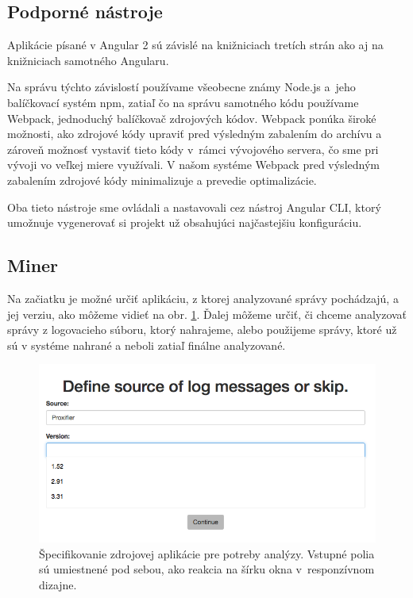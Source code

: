 \subsection{Podporné nástroje}
Aplikácie písané v Angular 2 sú závislé na knižniciach tretích strán ako aj na knižniciach samotného Angularu.
\par Na správu týchto závislostí používame všeobecne známy Node.js a~jeho balíčkovací systém npm, zatiaľ čo na správu samotného kódu používame Webpack, jednoduchý balíčkovač zdrojových kódov. Webpack ponúka široké možnosti, ako zdrojové kódy upraviť pred výsledným zabalením do archívu a zároveň možnosť vystaviť tieto kódy v~rámci vývojového servera, čo sme pri vývoji vo veľkej miere využívali. V našom systéme Webpack pred výsledným zabalením zdrojové kódy minimalizuje a prevedie optimalizácie.
\par Oba tieto nástroje sme ovládali a nastavovali cez nástroj Angular CLI, ktorý umožnuje vygenerovať si projekt už obsahujúci najčastejšiu konfiguráciu.


\subsection{Miner}
Na začiatku je možné určiť aplikáciu, z ktorej analyzované správy pochádzajú, a jej verziu, ako môžeme vidieť na obr. \ref{fig:miner-source}. Ďalej môžeme určiť, či chceme analyzovať správy z logovacieho súboru, ktorý nahrajeme, alebo použijeme správy, ktoré už sú v systéme nahrané a neboli zatiaľ finálne analyzované.

\begin{figure}[htbp]
 \centering 
 \begin{minipage}{0.95\linewidth}
 	\centering
 	\includegraphics[width=\textwidth]{Images/thesis-miner-source.png}
 \end{minipage}
  \caption{Špecifikovanie zdrojovej aplikácie pre potreby analýzy. \mbox{Vstupné} polia sú umiestnené pod sebou, ako reakcia na šírku okna v~responzívnom dizajne.}
  \label{fig:miner-source}
\end{figure}

